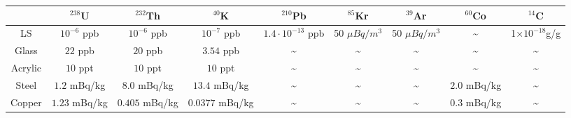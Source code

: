 \documentclass[a4paper,10pt,twoside]{paper}
\begin{document}
	\begin{center}
		\footnotesize
		\begin{tabular*}{190mm}{@{\extracolsep{\fill}}ccccccccc}
			\toprule \hphantom{0} & $^{238}$U & $^{232}$Th & $^{40}$K  & $^{210}$Pb & $^{85}$Kr & $^{39}$Ar & $^{60}$Co & $^{14}$C\\
			\hline
			LS & $10^{-6}$ ppb & $10^{-6}$ ppb & $10^{-7}$ ppb & $1.4\cdot10^{-13}$ ppb & 50 $\mu Bq/m^3$ & 50 $\mu Bq/m^3$ & \~{}  & 1$\times10^{-18}$g/g \\
			Glass & $22$ ppb & $20$ ppb & $3.54$ ppb & \~{} & \~{} & \~{} & \~{} & \~{} \\
			Acrylic & $10$ ppt  & $10$ ppt & $10$ ppt & \~{} & \~{} & \~{} & \~{} & \~{} \\
			Steel & $ 1.2$ mBq/kg & $8.0$ mBq/kg  & $13.4$ mBq/kg & \~{} & \~{} & \~{}& $2.0 $ mBq/kg  & \~{} \\
			Copper & $1.23$ mBq/kg  & $0.405$ mBq/kg & $0.0377$ mBq/kg & \~{} & \~{} & \~{} & $0.3 $ mBq/kg & \~{} \\
			\bottomrule
		\end{tabular*}
	\end{center}
\end{document}
